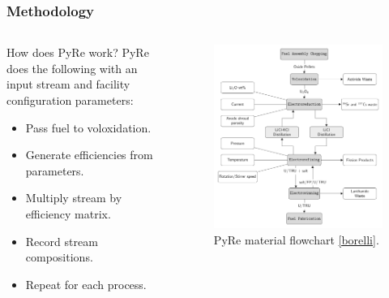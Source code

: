 \begin{frame}
  \frametitle{Methodology}
\begin{columns}
	\begin{column}{.45\textwidth}
		\begin{block}{How does PyRe work?} 
			PyRe does the following with an input stream and facility configuration parameters: 
			\begin{itemize}
				\item Pass fuel to voloxidation.
				\item Generate efficiencies from parameters.
				\item Multiply stream by efficiency matrix.
				\item Record stream compositions.
				\item Repeat for each process.
			\end{itemize}
		\end{block}
	\end{column}
	\begin{column}{.55\textwidth}
		\begin{figure}
			\centering
			\includegraphics[width=0.95\linewidth]{flowchart}
			\caption{PyRe material flowchart \ref{borelli}.}
			\label{fig:flowchart}
		\end{figure}
	\end{column}
\end{columns} 
\end{frame}

